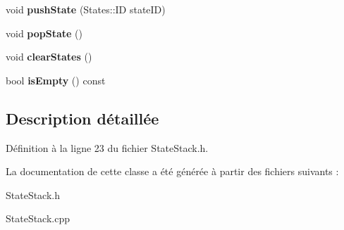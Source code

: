 \begin{DoxyCompactItemize}
void {\bfseries push\+State} (States\+::\+ID state\+ID)
\item 
\hypertarget{class_state_stack_a7e050a57b798295c2344f1318765b5ee}{}\label{class_state_stack_a7e050a57b798295c2344f1318765b5ee} 
void {\bfseries pop\+State} ()
\item 
\hypertarget{class_state_stack_a49f0703d4037c3bf63494e64cb09898d}{}\label{class_state_stack_a49f0703d4037c3bf63494e64cb09898d} 
void {\bfseries clear\+States} ()
\item 
\hypertarget{class_state_stack_a4d9dc16e1a69640b6a85c224fe1c3f33}{}\label{class_state_stack_a4d9dc16e1a69640b6a85c224fe1c3f33} 
bool {\bfseries is\+Empty} () const
\end{DoxyCompactItemize}


\subsection{Description détaillée}


Définition à la ligne 23 du fichier State\+Stack.\+h.



La documentation de cette classe a été générée à partir des fichiers suivants \+:\begin{DoxyCompactItemize}
\item 
State\+Stack.\+h\item 
State\+Stack.\+cpp\end{DoxyCompactItemize}
